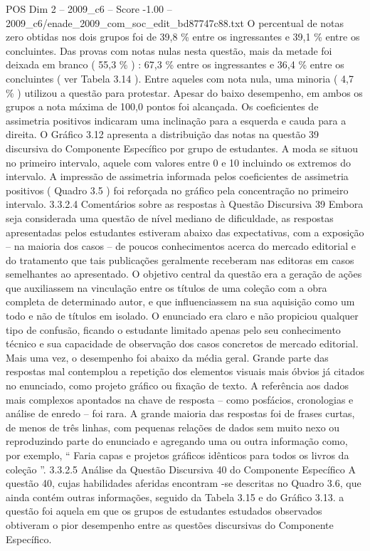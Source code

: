 \begin{textsample}{POS Dim 2 – 2009\_c6 – Score -1.00 – 2009\_c6/enade\_2009\_com\_soc\_edit\_bd87747c88.txt}
O percentual de notas zero obtidas nos dois grupos foi de 39,8 \% entre os ingressantes e 39,1 \% entre os concluintes.
Das provas com notas nulas nesta questão, mais da metade foi deixada em branco ( 55,3 \% ) : 67,3 \% entre os ingressantes e 36,4 \% entre os concluintes ( ver Tabela 3.14 ).
Entre aqueles com nota nula, uma minoria ( 4,7 \% ) utilizou a questão para protestar.
Apesar do baixo desempenho, em ambos os grupos a nota máxima de 100,0 pontos foi alcançada.
Os coeficientes de assimetria positivos indicaram uma inclinação para a esquerda e cauda para a direita.
O Gráfico 3.12 apresenta a distribuição das notas na questão 39 discursiva do Componente Específico por grupo de estudantes.
A moda se situou no primeiro intervalo, aquele com valores entre 0 e 10 incluindo os extremos do intervalo.
A impressão de assimetria informada pelos coeficientes de assimetria positivos ( Quadro 3.5 ) foi reforçada no gráfico pela concentração no primeiro intervalo. 3.3.2.4 Comentários sobre as respostas à Questão Discursiva 39 Embora seja considerada uma questão de nível mediano de dificuldade, as respostas apresentadas pelos estudantes estiveram abaixo das expectativas, com a exposição – na maioria dos casos – de poucos conhecimentos acerca do mercado editorial e do tratamento que tais publicações geralmente receberam nas editoras em casos semelhantes ao apresentado.
O objetivo central da questão era a geração de ações que auxiliassem na vinculação entre os títulos de uma coleção com a obra completa de determinado autor, e que influenciassem na sua aquisição como um todo e não de títulos em isolado.
O enunciado era claro e não propiciou qualquer tipo de confusão, ficando o estudante limitado apenas pelo seu conhecimento técnico e sua capacidade de observação dos casos concretos de mercado editorial.
Mais uma vez, o desempenho foi abaixo da média geral.
Grande parte das respostas mal contemplou a repetição dos elementos visuais mais óbvios já citados no enunciado, como projeto gráfico ou fixação de texto.
A referência aos dados mais complexos apontados na chave de resposta – como posfácios, cronologias e análise de enredo – foi rara.
A grande maioria das respostas foi de frases curtas, de menos de três linhas, com pequenas relações de dados sem muito nexo ou reproduzindo parte do enunciado e agregando uma ou outra informação como, por exemplo, “ Faria capas e projetos gráficos idênticos para todos os livros da coleção ”. 3.3.2.5 Análise da Questão Discursiva 40 do Componente Específico A questão 40, cujas habilidades aferidas encontram -se descritas no Quadro 3.6, que ainda contém outras informações, seguido da Tabela 3.15 e do Gráfico 3.13. a questão foi aquela em que os grupos de estudantes estudados observados obtiveram o pior desempenho entre as questões discursivas do Componente Específico.

\end{textsample}

